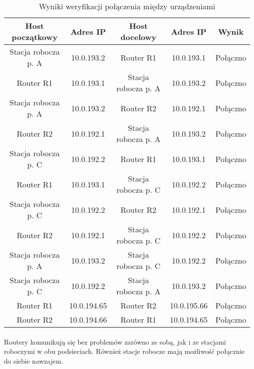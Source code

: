 \documentclass[wide,a4paper,titlepage,12pt] {article}
\begin{document}
\begin{table}[h]
  \begin{center}
    \begin{tabular}{|c|c||c|c||c|}
      \hline
      Host początkowy & Adres IP & Host docelowy & Adres IP & Wynik \\
      \hline
      Stacja robocza p. A       & 10.0.193.2    & Router R1             & 10.0.193.1  & Połączno \\
      Router R1                 & 10.0.193.1    & Stacja robocza p. A   & 10.0.193.2  & Połączno \\

      Stacja robocza p. A       & 10.0.193.2    & Router R2             & 10.0.192.1  & Połączno \\
      Router R2                 & 10.0.192.1    & Stacja robocza p. A   & 10.0.193.2  & Połączno \\

      Stacja robocza p. C       & 10.0.192.2    & Router R1             & 10.0.193.1  & Połączno \\
      Router R1                 & 10.0.193.1    & Stacja robocza p. C   & 10.0.192.2  & Połączno \\

      Stacja robocza p. C       & 10.0.192.2    & Router R2             & 10.0.192.1  & Połączno \\
      Router R2                 & 10.0.192.1    & Stacja robocza p. C   & 10.0.192.2  & Połączno \\

      Stacja robocza p. A       & 10.0.193.2    & Stacja robocza p. C   & 10.0.192.2  & Połączno \\
      Stacja robocza p. C       & 10.0.192.2    & Stacja robocza p. A   & 10.0.193.2  & Połączno \\

      Router R1                 & 10.0.194.65   & Router R2             & 10.0.195.66 & Połączno \\
      Router R2                 & 10.0.194.66   & Router R1             & 10.0.194.65 & Połączno \\
      \hline
    \end{tabular}
  \end{center}
  \caption{Wyniki weryfikacji połączenia między urządzeniami}
\end{table}

  \paragraph{}
  Routery komunikują się bez problemów zarówno ze sobą, jak i ze stacjami roboczymi w obu podsieciach. Również stacje robocze mają możliwość połącznie do siebie nawzajem.
\end{document}
